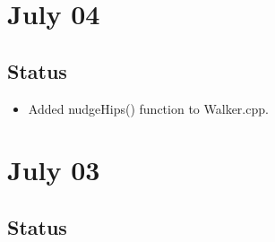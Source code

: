 \documentclass[letterpaper, 10 pt]{report}
\begin{document}
\section*{July 04}
\subsection*{Status}
\begin{itemize}
\item Added nudgeHips() function to Walker.cpp.
\end{itemize}

\section*{July 03}
\subsection*{Status}
\end{document}
